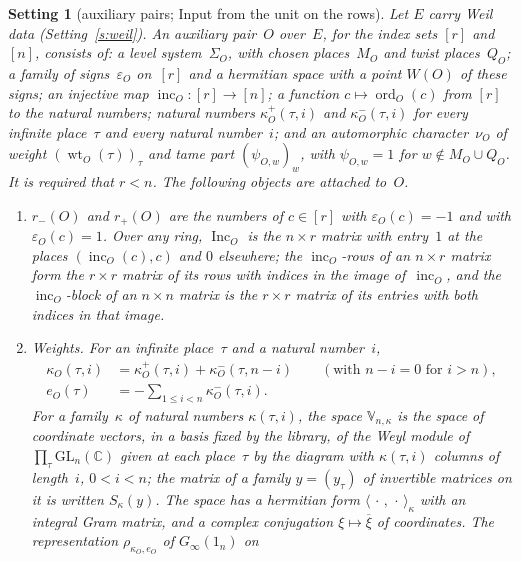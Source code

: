 \documentclass[11pt,a4paper]{article}
\newcommand{\m}[1]{\mbox{$#1$}}        %
\theoremstyle{plainx}
\theoremstyle{uprightx}
\newtheorem{setting}[theorem]{Setting}          %
\newcommand{\CC}{\mathbb{C}}
\newcommand{\Ginf}[1]{G_{\infty}(#1)}
\newcommand{\one}[1]{1_{#1}}
\newcommand{\WO}[1]{W(#1)}
\newcommand{\sgO}[1]{\varepsilon_{#1}}
\newcommand{\rmi}[1]{r_{-}(#1)}
\newcommand{\rpl}[1]{r_{+}(#1)}
\newcommand{\incO}[1]{\operatorname{inc}_{#1}}
\newcommand{\IncM}[1]{\operatorname{Inc}_{#1}}
\newcommand{\ordO}[2]{\operatorname{ord}_{#1}(#2)}
\newcommand{\kp}[3]{\kappa^{+}_{#1}(#2,#3)}
\newcommand{\km}[3]{\kappa^{-}_{#1}(#2,#3)}
\newcommand{\kap}[1]{\kappa_{#1}}
\newcommand{\eO}[1]{e_{#1}}
\newcommand{\muO}[1]{\nu_{#1}}
\newcommand{\wtO}[2]{\operatorname{wt}_{#1}(#2)}
\newcommand{\psiO}[2]{\psi_{#1,#2}}
\newcommand{\MO}[1]{M_{#1}}
\newcommand{\QO}[1]{Q_{#1}}
\newcommand{\SigO}[1]{\Sigma_{#1}}
\newcommand{\Vk}[2]{\mathbb{V}_{#1,#2}}
\newcommand{\rhoW}[2]{\rho_{#1,#2}}
\newcommand{\gram}[3]{\langle #2,#3\rangle_{#1}}
\newcommand{\Sch}[1]{S_{#1}}
\newcommand{\conj}[1]{\overline{#1}}
\begin{document}
\begin{setting}[auxiliary pairs; Input from the unit on the rows]\label{s:aux}
Let $E$ carry Weil data (Setting~\ref{s:weil}). An \emph{auxiliary pair}~$O$ over~$E$, for the index sets $[r]$
and~$[n]$, consists of: a level system~$\SigO{O}$, with chosen places~$\MO{O}$ and twist places~$\QO{O}$; a
family of signs~$\sgO{O}$ on~$[r]$ and a hermitian space with a point \m{\WO{O}} of these signs; an injective map
\m{\incO{O}\colon[r]\to[n]}; a function \m{c\mapsto\ordO{O}{c}} from $[r]$ to the natural numbers; natural
numbers \m{\kp{O}{\tau}{i}} and \m{\km{O}{\tau}{i}} for every infinite place~$\tau$ and every natural number~$i$; and
an automorphic character~$\muO{O}$ of weight \m{(\wtO{O}{\tau})_{\tau}} and tame part \m{(\psiO{O}{w})_{w}}, with
\m{\psiO{O}{w}=1} for \m{w\notin\MO{O}\cup\QO{O}}. It is required that \m{r<n}. The following objects are attached
to~$O$.
\begin{enumerate}[label=\textup{(\alph*)},leftmargin=2.2em,itemsep=2pt,topsep=2pt]
\item \m{\rmi{O}} and \m{\rpl{O}} are the numbers of \m{c\in[r]} with \m{\sgO{O}(c)=-1} and with
\m{\sgO{O}(c)=1}. Over any ring, \m{\IncM{O}} is the \m{n\times r} matrix with entry~$1$ at the places
\m{(\incO{O}(c),c)} and $0$ elsewhere; the \emph{$\incO{O}$-rows} of an \m{n\times r} matrix form the \m{r\times r}
matrix of its rows with indices in the image of~$\incO{O}$, and the \emph{$\incO{O}$-block} of an \m{n\times n}
matrix is the \m{r\times r} matrix of its entries with both indices in that image.
\item \emph{Weights.} For an infinite place~$\tau$ and a natural number~$i$,
\begin{align*}
\kap{O}(\tau,i)&=\kp{O}{\tau}{i}+\km{O}{\tau}{n-i}\qquad(\text{with }n-i=0\text{ for }i>n),\\
\eO{O}(\tau)&=-\sum_{1\le i<n}\km{O}{\tau}{i}.
\end{align*}
For a family~$\kappa$ of natural numbers \m{\kappa(\tau,i)}, the space \m{\Vk{n}{\kappa}} is the space of coordinate vectors, in a basis fixed by the library, of the Weyl module of
\m{\prod_{\tau}\mathrm{GL}_{n}(\CC)} given at each place~$\tau$ by the diagram with \m{\kappa(\tau,i)} columns of
length~$i$, \m{0<i<n}; the matrix of a family \m{y=(y_{\tau})} of invertible matrices on it is written
\m{\Sch{\kappa}(y)}. The space has a hermitian
form \m{\gram{\kappa}{\,\cdot\,}{\,\cdot\,}} with an integral Gram matrix, and a complex conjugation
\m{\xi\mapsto\conj{\xi}} of coordinates. The representation \m{\rhoW{\kap{O}}{\eO{O}}} of \m{\Ginf{\one{n}}} on

\end{enumerate}
\end{setting}
\end{document}

